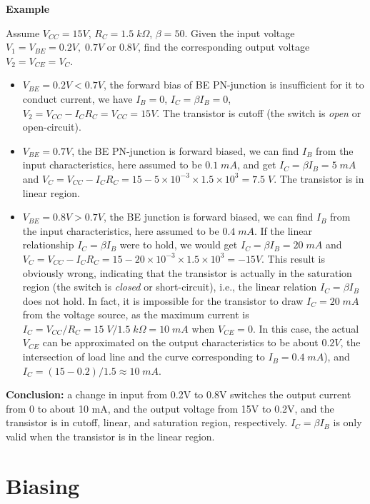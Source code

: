 

{\bf Example}


Assume $V_{CC}=15V$, $R_C=1.5\;k\Omega$, $\beta=50$. Given the input voltage 
$V_1=V_{BE}=0.2V,\;0.7V$ or $0.8V$, find the corresponding output voltage 
$V_2=V_{CE}=V_C$.

\begin{itemize}
\item $V_{BE}=0.2V < 0.7V$, the forward bias of BE PN-junction is insufficient
  for it to conduct current, we have $I_B=0$, $I_C=\beta I_B=0$, $V_2
  =V_{CC}-I_C R_C=V_{CC}=15V$. The transistor is cutoff (the switch is 
  {\em open} or open-circuit).
\item $V_{BE}=0.7V$, the BE PN-junction is forward biased, we can find $I_B$
  from the input characteristics, here assumed to be $0.1\;mA$, and get
  $I_C=\beta I_B=5\;mA$ and 
  $V_C=V_{CC}-I_C R_C=15-5\times 10^{-3} \times 1.5\times 10^{3} =7.5\; V$. 
  The transistor is in linear region.
\item $V_{BE}=0.8V>0.7V$, the BE junction is forward biased, we can find $I_B$
  from the input characteristics, here assumed to be $0.4\;mA$. If the linear
  relationship $I_C=\beta I_B$ were to hold, we would get $I_C=\beta I_B=20\;mA$
  and $V_C=V_{CC}-I_C R_C=15-20\times 10^{-3} \times 1.5\times 10^{3}=-15 V$. 
  This result is obviously wrong, indicating that the transistor is actually 
  in the saturation region (the switch is {\em closed} or short-circuit), 
  i.e., the linear relation $I_C=\beta I_B$ does not hold. In fact, it is 
  impossible for the transistor to draw $I_C=20\;mA$ from the voltage source, 
  as the maximum current is $I_C=V_{CC}/R_C=15\;V/1.5\; k\Omega=10\;mA$ when
  $V_{CE}=0$. In this case, the actual $V_{CE}$ can be approximated on the output 
  characteristics to be about $0.2V$, the intersection of load line and the 
  curve corresponding to $I_B=0.4\;mA$), and $I_C=(15-0.2)/1.5\approx 10\;mA$. 
\end{itemize}
{\bf Conclusion: } a change in input from 0.2V to 0.8V switches the output 
current from 0 to about 10 mA, and the output voltage from 15V to 0.2V,
and the transistor is in cutoff, linear, and saturation region, respectively. 
$I_C=\beta I_B$ is only valid when the transistor is in the linear region.

\section*{Biasing}

